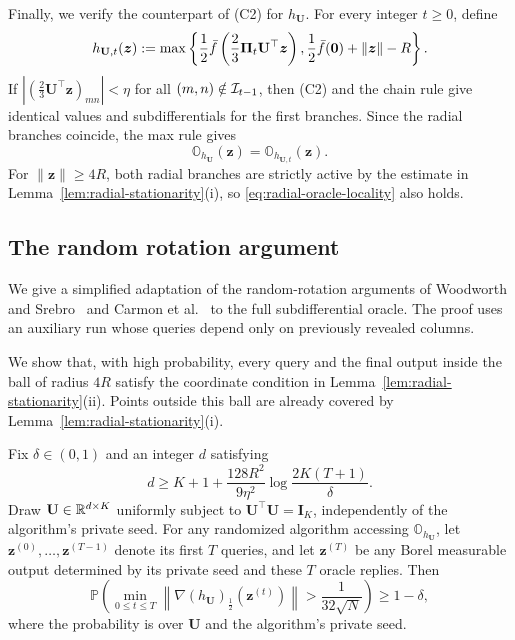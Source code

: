 Finally, we verify the counterpart of
\textnormal{(C2)} for $h_{\mathbf U}$.
For every integer $t\ge0$, define
\[
 h_{\mathbf U,t}(\bm z)
 :=
 \max\left\{
 \frac12\bar f\left(\frac23\mathbf\Pi_t\mathbf U^\top\bm z\right),
 \frac12\bar f({\mathbf 0})+\|\bm z\|-R
 \right\}.
\]
If $|(\tfrac23\mathbf U^\top\bm z)_{mn}|<\eta$
for all $(m,n)\notin{\cal I}_{t-1}$, then
\textnormal{(C2)} and the chain rule give identical
values and subdifferentials for the first branches.
Since the radial branches coincide, the max rule gives
\begin{equation}
 \mathbb O_{h_{\mathbf U}}(\bm z)
 =
 \mathbb O_{h_{\mathbf U,t}}(\bm z).
 \label{eq:radial-oracle-locality}
\end{equation}
For $\|\bm z\|\ge4R$, both radial branches are strictly
active by the estimate in
Lemma~\ref{lem:radial-stationarity}(i), so
\eqref{eq:radial-oracle-locality} also holds.

\subsection{The random rotation argument}
\label{subsec:random-rotation}
We give a simplified adaptation of the random-rotation
arguments of Woodworth and Srebro~\citep{woodworth2016tight}
and Carmon et al.\
\citep[Section~5.1]{carmon2020lower}
to the full subdifferential oracle.
The proof uses an auxiliary run whose queries depend
only on previously revealed columns.

We show that, with high probability, every query
and the final output inside the ball of radius $4R$
satisfy the coordinate condition in
Lemma~\ref{lem:radial-stationarity}(ii). 
Points outside this ball are already covered by
Lemma~\ref{lem:radial-stationarity}(i).
\begin{lemma}
\label{lem:randomized-reduction}
Fix $\delta\in(0,1)$ and an integer $d$ satisfying
\begin{equation}
 d\ge K+1+\frac{128R^2}{9\eta^2}
       \log\frac{2K(T+1)}{\delta}.
 \label{eq:rotation-dimension}
\end{equation}
Draw $\mathbf U\in{\mathbb{R}}^{d\times K}$ uniformly subject to
$\mathbf U^\top\mathbf U=\mathbf I_K$,
independently of the algorithm's private seed.
For any randomized algorithm accessing
$\mathbb O_{h_{\mathbf U}}$, let
$\bm z^{(0)},\ldots,\bm z^{(T-1)}$ denote its
first $T$ queries, and let $\bm z^{(T)}$ be any
Borel measurable output determined by its private
seed and these $T$ oracle replies.
Then
\[
 \mathbb P\left(
 \min_{0\le t\le T}
 \left\|\nabla(h_{\mathbf U})_{\tfrac12}
                  (\bm z^{(t)})\right\|
 >\frac1{32\sqrt N}
 \right)\ge1-\delta,
\]
where the probability is over $\mathbf U$ and the
algorithm's private seed.
\end{lemma}

